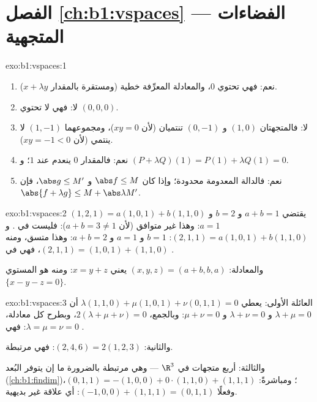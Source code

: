 \section*{الفصل \ref{ch:b1:vspaces} --- الفضاءات المتجهية}

\begin{solution}{exo:b1:vspaces:1}
\begin{enumerate}
  \item نعم: فهي تحتوي $0$، والمعادلة المعرِّفة خطية
        (ومستقرة بالمقدار $x + \lambda y$).
  \item لا: فهي لا تحتوي $(0,0,0)$.
  \item لا: فالمتجهتان $(1, 0)$ و $(0, -1)$ تنتميان (لأن $xy = 0$)، ومجموعهما $(1,
        -1)$ لا ينتمي (لأن $xy = -1 < 0$).
  \item نعم: فالمقدار $0$ ينعدم عند $1$؛ و $(P + \lambda Q)(1) = P(1) +
        \lambda Q(1) = 0$.
  \item نعم: فالدالة المعدومة محدودة؛ وإذا كان $\abs f \leq M$ و
        $\abs g \leq M'$، فإن $\abs{f + \lambda g} \leq M +
        \abs\lambda M'$.
\end{enumerate}
\end{solution}

\begin{solution}{exo:b1:vspaces:2}
$(1,2,1) = a(1,0,1) + b(1,1,0)$ يقتضي $a + b = 1$ و $b = 2$ و $a =
1$: وهذا غير متوافق (لأن $a + b = 3 \neq 1$): فليست في . و
$(2,1,1) =
a(1,0,1) + b(1,1,0)$: $b = 1$ و $a = 1$ و $a + b = 2$: وهذا متسق، ومنه
$(2,1,1) = (1,0,1) + (1,1,0)$، فهي في .

والمعادلة: $(x, y, z) = (a + b, b, a)$ يعني $x = y + z$: ومنه  هو
المستوي $\{x - y - z = 0\}$.
\end{solution}

\begin{solution}{exo:b1:vspaces:3}
العائلة الأولى: يعطي $\lambda(1,1,0) + \mu(1,0,1) + \nu(0,1,1) = 0$
أن $\lambda + \mu = 0$ و $\lambda + \nu = 0$ و $\mu + \nu = 0$: وبالجمع،
$2(\lambda + \mu + \nu) = 0$، وبطرح كل معادلة،
$\lambda = \mu = \nu = 0$: فهي .

والثانية: $(2,4,6) = 2(1,2,3)$: فهي مرتبطة.

والثالثة: أربع متجهات في $\R^3$ --- وهي مرتبطة بالضرورة ما إن يتوفر
البُعد (\cref{ch:b1:findim})؛ ومباشرةً: $(0,1,1) = -(1,0,0) +
0\cdot(1,1,0) + (1,1,1)$، وفعلًا $(-1,0,0) + (1,1,1) = (0,1,1)$: أي
علاقة غير بديهية.
\end{solution}

